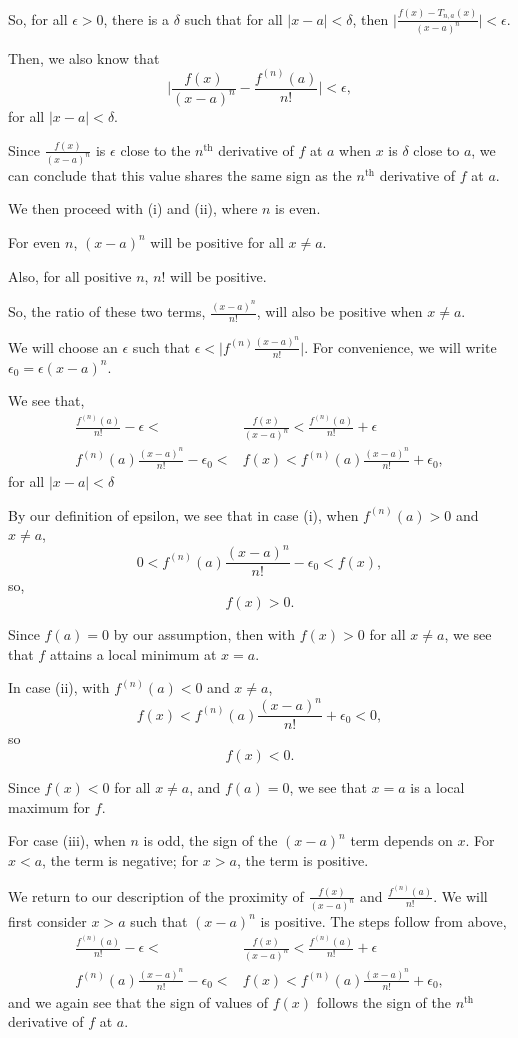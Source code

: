 \documentclass[../hw3]{subfiles}
\begin{document}
So, for all $\epsilon>0$, there is a $\delta$ such that for all $|x-a|<\delta$, then $\Big|\frac{f(x)-T_{n,a}(x)}{{(x-a)}^n}\Big|<\epsilon$.

Then, we also know that \[\Bigg|\frac{f(x)}{{(x-a)}^n}-\frac{f^{(n)}(a)}{n!}\Bigg|<\epsilon,\]
for all $|x-a|<\delta$.

Since $\frac{f(x)}{{(x-a)}^n}$ is $\epsilon$ close to the $n^{\text{th}}$ derivative of $f$ at $a$ when $x$ is $\delta$ close to $a$, we can conclude that this value shares the same sign as the $n^{\text{th}}$ derivative of $f$ at $a$.

We then proceed with (i) and (ii), where $n$ is even. 

For even $n$, ${(x-a)}^n$ will be positive for all $x\neq a$.
 
Also, for all positive $n$, $n!$ will be positive.

So, the ratio of these two terms, $\frac{{(x-a)}^n}{n!}$, will also be positive when $x \neq a$.

We will choose an $\epsilon$ such that $\epsilon<\Big|f^{(n)}\frac{{(x-a)}^n}{n!}\Big|$. For convenience, we will write $\epsilon_0 = \epsilon {(x-a)}^n$.

We see that,
\begin{align*}
    \frac{f^{(n)}(a)}{n!} - \epsilon < &\frac{f(x)}{{(x-a)}^n} < \frac{f^{(n)}(a)}{n!} + \epsilon \\
    f^{(n)}(a)\frac{{(x-a)}^n}{n!} - \epsilon_0 < &f(x) < f^{(n)}(a)\frac{{(x-a)}^n}{n!} + \epsilon_0,
\end{align*}
for all $|x-a|<\delta$

By our definition of epsilon, we see that in case (i), when $f^{(n)}(a)>0$ and $x \neq a$,
\[0<f^{(n)}(a)\frac{{(x-a)}^n}{n!} - \epsilon_0 < f(x),\]
so, \[f(x)>0.\]

Since $f(a)=0$ by our assumption, then with $f(x)>0$ for all $x\neq a$, we see that $f$ attains a local minimum at $x=a$.

In case (ii), with $f^{(n)}(a)<0$ and $x \neq a$, 
\[f(x)<f^{(n)}(a)\frac{{(x-a)}^n}{n!} + \epsilon_0 < 0,\] 
so \[f(x)<0.\]

Since $f(x)<0$ for all $x \neq a$, and $f(a)=0$, we see that $x=a$ is a local maximum for $f$.

For case (iii), when $n$ is odd, the sign of the ${(x-a)}^n$ term depends on $x$. For $x<a$, the term is negative; for $x>a$, the term is positive.

We return to our description of the proximity of $\frac{f(x)}{{(x-a)}^n}$ and $\frac{f^{(n)}(a)}{n!}$. We will first consider $x>a$ such that ${(x-a)}^n$ is positive. The steps follow from above, 
\begin{align*}
    \frac{f^{(n)}(a)}{n!} - \epsilon < &\frac{f(x)}{{(x-a)}^n} < \frac{f^{(n)}(a)}{n!} + \epsilon \\
    f^{(n)}(a)\frac{{(x-a)}^n}{n!} - \epsilon_0 < &f(x) < f^{(n)}(a)\frac{{(x-a)}^n}{n!} + \epsilon_0,
\end{align*} 
and we again see that the sign of values of $f(x)$ follows the sign of the $n^{\text{th}}$ derivative of $f$ at $a$. 
\end{document}
